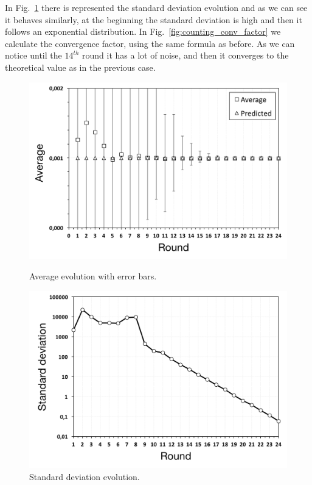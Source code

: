 In Fig.~\ref{fig:counting_standard_deviation} there is represented the standard deviation evolution and as we can see it behaves similarly, at the beginning the standard deviation is high and then it follows an exponential distribution. In Fig.~\ref{fig:counting_conv_factor} we calculate the convergence factor, using the same formula as before. As we can notice until the $14^{th}$ round it has a lot of noise, and then it converges to the theoretical value as in the previous case.


\begin{figure}[p]
\centering
\includegraphics[keepaspectratio=true, width=\textwidth]{images/counting_average}
\caption{Average evolution with error bars.}
\label{fig:counting_average}
\includegraphics[keepaspectratio=true, width=\textwidth]{images/counting_standard_deviation}
\caption{Standard deviation evolution.}
\label{fig:counting_standard_deviation}
\end{figure}



